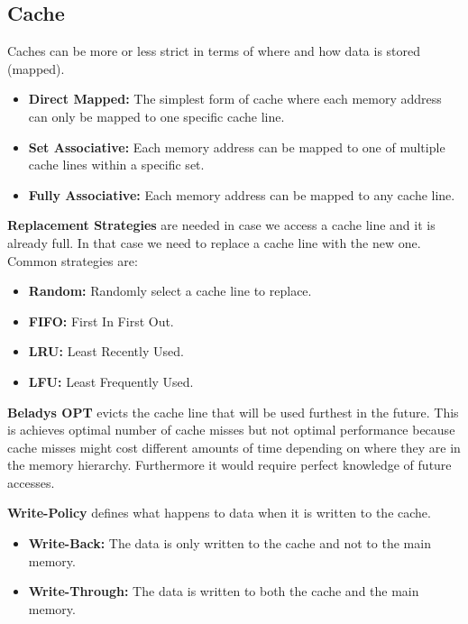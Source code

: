 \subsection{Cache}

\begin{definition}
	Caches can be more or less strict in terms of where and how data is stored (mapped).
	\begin{itemize}
		\item \textbf{Direct Mapped:} The simplest form of cache where each memory address can only be mapped to one specific cache line.
		\item \textbf{Set Associative:} Each memory address can be mapped to one of multiple cache lines within a specific set.
		\item \textbf{Fully Associative:} Each memory address can be mapped to any cache line.
	\end{itemize}
\end{definition}

\begin{definition}
	\textbf{Replacement Strategies} are needed in case we access a cache line and it is already full. In that case we need to replace a cache line with the new one. Common strategies are:
	\begin{itemize}
		\item \textbf{Random:} Randomly select a cache line to replace.
		\item \textbf{FIFO:} First In First Out.
		\item \textbf{LRU:} Least Recently Used.
		\item \textbf{LFU:} Least Frequently Used.
	\end{itemize}
\end{definition}

\begin{definition}
	\textbf{Beladys OPT} evicts the cache line that will be used furthest in the future. This is achieves optimal number of cache misses but not optimal performance because cache misses might cost different amounts of time depending on where they are in the memory hierarchy. Furthermore it would require perfect knowledge of future accesses.
\end{definition}

\begin{definition}
	\textbf{Write-Policy} defines what happens to data when it is written to the cache.
	\begin{itemize}
		\item \textbf{Write-Back:} The data is only written to the cache and not to the main memory.
		\item \textbf{Write-Through:} The data is written to both the cache and the main memory.
	\end{itemize}
\end{definition}

